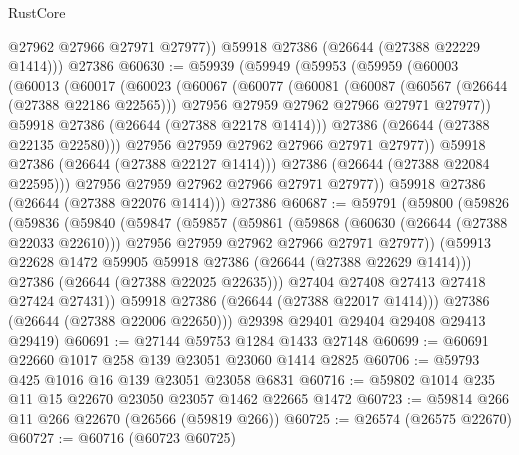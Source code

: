 \begin{lexlean}{RustCore}
\begin{coremodule}
          @27962
          @27966
          @27971
          @27977))
      @59918
      @27386
      (@26644 (@27388 @22229 @1414)))
    @27386
@60630 := @59939
    (@59949
      (@59953
        (@59959
          (@60003
            (@60013
              (@60017
                (@60023
                  (@60067
                    (@60077
                      (@60081
                        (@60087
                          (@60567 (@26644 (@27388 @22186 @22565)))
                          @27956
                          @27959
                          @27962
                          @27966
                          @27971
                          @27977))
                      @59918
                      @27386
                      (@26644 (@27388 @22178 @1414)))
                    @27386
                    (@26644 (@27388 @22135 @22580)))
                  @27956
                  @27959
                  @27962
                  @27966
                  @27971
                  @27977))
              @59918
              @27386
              (@26644 (@27388 @22127 @1414)))
            @27386
            (@26644 (@27388 @22084 @22595)))
          @27956
          @27959
          @27962
          @27966
          @27971
          @27977))
      @59918
      @27386
      (@26644 (@27388 @22076 @1414)))
    @27386
@60687 := @59791
    (@59800
      (@59826
        (@59836
          (@59840
            (@59847
              (@59857
                (@59861
                  (@59868
                    (@60630 (@26644 (@27388 @22033 @22610)))
                    @27956
                    @27959
                    @27962
                    @27966
                    @27971
                    @27977))
                (@59913 @22628 @1472 @59905 @59918 @27386 (@26644 (@27388 @22629 @1414)))
                @27386
                (@26644 (@27388 @22025 @22635)))
              @27404
              @27408
              @27413
              @27418
              @27424
              @27431))
          @59918
          @27386
          (@26644 (@27388 @22017 @1414)))
        @27386
        (@26644 (@27388 @22006 @22650)))
      @29398
      @29401
      @29404
      @29408
      @29413
      @29419)
@60691 := @27144 @59753 @1284 @1433 @27148
@60699 := @60691 @22660 @1017 @258 @139 @23051 @23060 @1414 @2825
@60706 := @59793 @425 @1016 @16 @139 @23051 @23058 @6831
@60716 := @59802 @1014 @235 @11 @15 @22670 @23050 @23057 @1462 @22665 @1472
@60723 := @59814 @266 @11 @266 @22670 (@26566 (@59819 @266))
@60725 := @26574 (@26575 @22670)
@60727 := @60716 (@60723 @60725)

\end{coremodule}
\end{lexlean}
